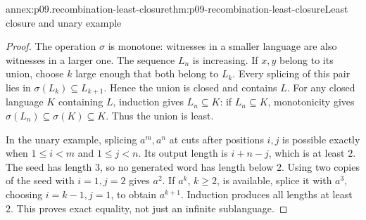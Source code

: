 \begin{annexitem}{annex:p09.recombination-least-closure}{thm:p09-recombination-least-closure}{Least closure and unary example}
\begin{proof}
The operation \(\sigma\) is monotone: witnesses in a smaller language
are also witnesses in a larger one. The sequence \(L_n\) is increasing.
If \(x,y\) belong to its union, choose \(k\) large enough that both belong
to \(L_k\). Every splicing of this pair lies in
\(\sigma(L_k)\subseteq L_{k+1}\). Hence the union is closed and contains \(L\).
For any closed language \(K\) containing \(L\), induction gives
\(L_n\subseteq K\): if \(L_n\subseteq K\), monotonicity gives
\(\sigma(L_n)\subseteq\sigma(K)\subseteq K\). Thus the union is least.

In the unary example, splicing \(a^m,a^n\) at cuts after positions
\(i,j\) is possible exactly when \(1\leq i<m\) and \(1\leq j<n\).
Its output length is \(i+n-j\), which is at least \(2\).
The seed has length \(3\), so no generated word has length below \(2\).
Using two copies of the seed with \(i=1,j=2\) gives \(a^2\).
If \(a^k\), \(k\geq2\), is available, splice it with \(a^3\),
choosing \(i=k-1,j=1\), to obtain \(a^{k+1}\).
Induction produces all lengths at least \(2\). This proves exact equality,
not just an infinite sublanguage.
\end{proof}
\end{annexitem}

